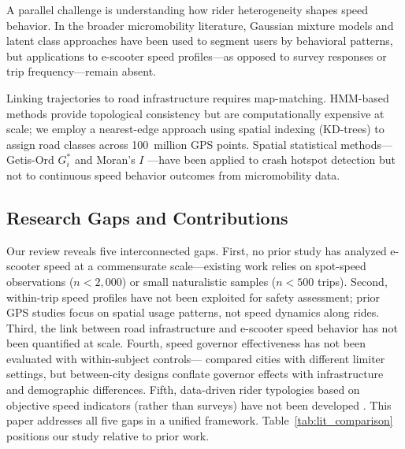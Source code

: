 A parallel challenge is understanding how rider heterogeneity shapes speed behavior. In the broader micromobility literature, Gaussian mixture models \citep{quddus2013speed} and latent class approaches \citep{jena2025latent} have been used to segment users by behavioral patterns, but applications to e-scooter speed profiles---as opposed to survey responses or trip frequency---remain absent.

Linking trajectories to road infrastructure requires map-matching. HMM-based methods \citep{newson2009hidden} provide topological consistency but are computationally expensive at scale; we employ a nearest-edge approach using spatial indexing (KD-trees) to assign road classes across 100~million GPS points. Spatial statistical methods---Getis-Ord $G_i^*$ \citep{getis1992analysis} and Moran's $I$ \citep{moran1950notes}---have been applied to crash hotspot detection \citep{chen2015bicycle, shah2021crash} but not to continuous speed behavior outcomes from micromobility data.

\subsection{Research Gaps and Contributions}
\label{sec:lit_gaps}

Our review reveals five interconnected gaps. First, no prior study has analyzed e-scooter speed at a commensurate scale---existing work relies on spot-speed observations ($n < 2{,}000$) or small naturalistic samples ($n < 500$ trips). Second, within-trip speed profiles have not been exploited for safety assessment; prior GPS studies focus on spatial usage patterns, not speed dynamics along rides. Third, the link between road infrastructure and e-scooter speed behavior has not been quantified at scale. Fourth, speed governor effectiveness has not been evaluated with within-subject controls---\citet{cicchino2023speed} compared cities with different limiter settings, but between-city designs conflate governor effects with infrastructure and demographic differences. Fifth, data-driven rider typologies based on objective speed indicators (rather than surveys) have not been developed \citep{degele2018identifying, jena2025latent}. This paper addresses all five gaps in a unified framework. Table~\ref{tab:lit_comparison} positions our study relative to prior work.

